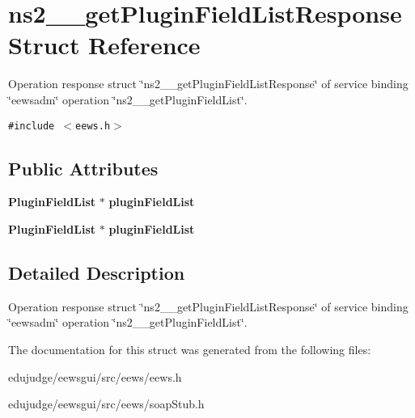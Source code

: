 \section{ns2\_\-\_\-getPluginFieldListResponse Struct Reference}
\label{structns2____getPluginFieldListResponse}
Operation response struct \char`\"{}ns2\_\-\_\-getPluginFieldListResponse\char`\"{} of service binding \char`\"{}eewsadm\char`\"{} operation \char`\"{}ns2\_\-\_\-getPluginFieldList\char`\"{}.  


{\tt \#include $<$eews.h$>$}

\subsection*{Public Attributes}
\begin{CompactItemize}
\item 
{\bf PluginFieldList} $\ast$ \textbf{pluginFieldList}\label{structns2____getPluginFieldListResponse_1f9710ec51e9eb4c8432d08be8e87608}

\item 
{\bf PluginFieldList} $\ast$ \textbf{pluginFieldList}\label{structns2____getPluginFieldListResponse_1f9710ec51e9eb4c8432d08be8e87608}

\end{CompactItemize}


\subsection{Detailed Description}
Operation response struct \char`\"{}ns2\_\-\_\-getPluginFieldListResponse\char`\"{} of service binding \char`\"{}eewsadm\char`\"{} operation \char`\"{}ns2\_\-\_\-getPluginFieldList\char`\"{}. 

The documentation for this struct was generated from the following files:\begin{CompactItemize}
\item 
edujudge/eewsgui/src/eews/eews.h\item 
edujudge/eewsgui/src/eews/soapStub.h\end{CompactItemize}
